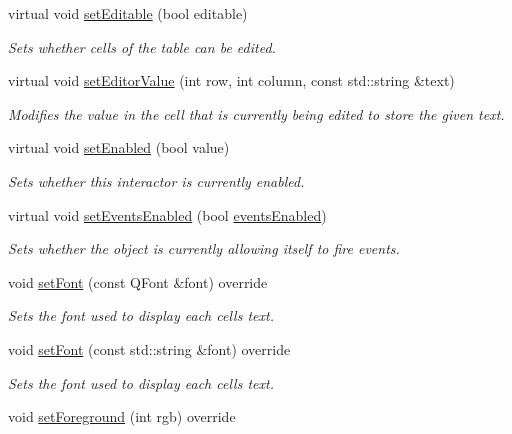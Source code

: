 \begin{DoxyCompactItemize}
virtual void \mbox{\hyperlink{classsgl_1_1GTable_a52455aaff9ee352ca405fa61ba246b84}{set\+Editable}} (bool editable)
\begin{DoxyCompactList}\small\item\em Sets whether cells of the table can be edited. \end{DoxyCompactList}\item 
virtual void \mbox{\hyperlink{classsgl_1_1GTable_aaefc85e4ff762ca176a90ebac163f2c0}{set\+Editor\+Value}} (int row, int column, const std\+::string \&text)
\begin{DoxyCompactList}\small\item\em Modifies the value in the cell that is currently being edited to store the given text. \end{DoxyCompactList}\item 
virtual void \mbox{\hyperlink{classsgl_1_1GInteractor_ab831367dd84bbd579e02e55bacb21343}{set\+Enabled}} (bool value)
\begin{DoxyCompactList}\small\item\em Sets whether this interactor is currently enabled. \end{DoxyCompactList}\item 
virtual void \mbox{\hyperlink{classsgl_1_1GObservable_afaa30b2a9e0f378fd1c70d2f1d0b8216}{set\+Events\+Enabled}} (bool \mbox{\hyperlink{classsgl_1_1GInteractor_a597a370b592e3737d38d9d2f4e2031ea}{events\+Enabled}})
\begin{DoxyCompactList}\small\item\em Sets whether the object is currently allowing itself to fire events. \end{DoxyCompactList}\item 
void \mbox{\hyperlink{classsgl_1_1GTable_ad1d75b3840a41ba7d1e8a921696dc684}{set\+Font}} (const Q\+Font \&font) override
\begin{DoxyCompactList}\small\item\em Sets the font used to display each cell\textquotesingle{}s text. \end{DoxyCompactList}\item 
void \mbox{\hyperlink{classsgl_1_1GTable_a51367c9fd2709973b1f7238734f93891}{set\+Font}} (const std\+::string \&font) override
\begin{DoxyCompactList}\small\item\em Sets the font used to display each cell\textquotesingle{}s text. \end{DoxyCompactList}\item 
void \mbox{\hyperlink{classsgl_1_1GTable_a59f7cd2bd1708c12dfa52a8f7c7b79c9}{set\+Foreground}} (int rgb) override

\end{DoxyCompactItemize}
